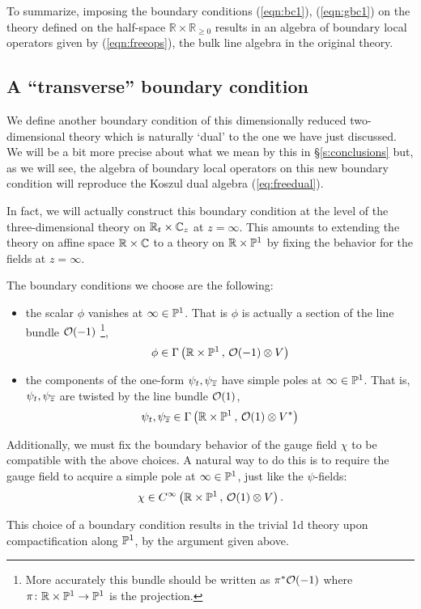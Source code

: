 \documentclass[11pt]{amsart}
\begin{document}
To summarize, imposing the boundary conditions (\ref{eqn:bc1}), (\ref{eqn:gbc1}) on the theory defined on the half-space $\mathbb{R} \times \mathbb{R}_{\geq 0}$ results in an algebra of boundary local operators given by (\ref{eqn:freeops}), the bulk line algebra in the original theory.  

\subsection{A ``transverse'' boundary condition}
%
We define another boundary condition of this dimensionally reduced two-dimensional theory which is naturally `dual' to the one we have just discussed. We will be a bit more precise about what we mean by this in \S \ref{s:conclusions} but, as we will see, the algebra of boundary local operators on this new boundary condition will reproduce the Koszul dual algebra (\ref{eq:freedual}).

In fact, we will actually construct this boundary condition at the level of the three-dimensional theory on $\mathbb R_t \times \mathbb C_z$ at $z = \infty$. 
This amounts to extending the theory on affine space $\mathbb R \times \mathbb C$ to a theory on $\mathbb R \times \mathbb P^1$ by fixing the behavior for the fields at $z = \infty$. 

The boundary conditions we choose are the following:
\begin{itemize}
\item the scalar $\phi$ vanishes at $\infty \in \mathbb P^1$. 
That is $\phi$ is actually a section of the line bundle $\mathcal O(-1)$ \footnote{More accurately this bundle should be written as $\pi^* \mathcal O(-1)$ where $\pi \colon \mathbb R \times \mathbb P^1 \to \mathbb P^1$ is the projection.}, 
\[
\phi \in \Gamma \left(\mathbb R \times \mathbb P^1 \, , \, \mathcal O(-1) \otimes V \right) 
\]
\item the components of the one-form $\psi_{t}, \psi_{{\overline{z}}}$ have simple poles at $\infty \in \mathbb P^1$.
That is, $\psi_t,\psi_{{\overline{z}}}$ are twisted by the line bundle $\mathcal O(1)$,
\[
\psi_{t}, \psi_{{\overline{z}}}\in \Gamma\left(\mathbb R \times \mathbb P^1 \, , \, \mathcal O(1) \otimes V^*\right)
\]
\end{itemize}

Additionally, we must fix the boundary behavior of the gauge field $\chi$ to be compatible with the above choices.
A natural way to do this is to require the gauge field to acquire a simple pole at $\infty \in \mathbb P^1$, just like the $\psi$-fields:
\[
\chi \in C^\infty\left(\mathbb R \times \mathbb P^1 \, , \, \mathcal O(1) \otimes V\right) .
\]

This choice of a boundary condition results in the trivial 1d theory upon compactification along $\mathbb P^1$, by the argument given above. 
\end{document}
